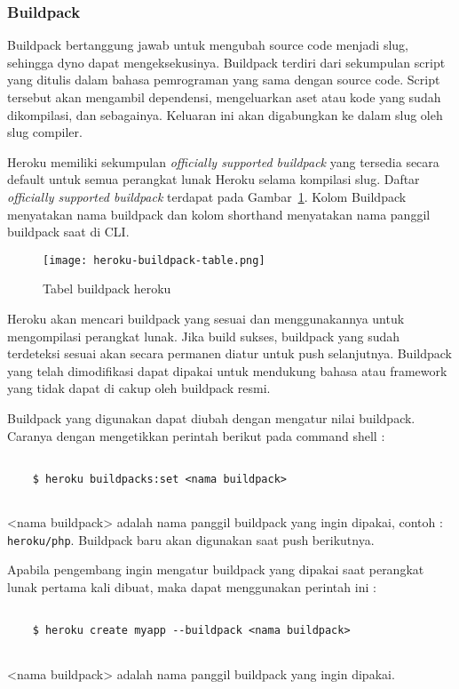 \subsubsection{Buildpack}
Buildpack bertanggung jawab untuk mengubah source code menjadi slug, sehingga dyno dapat mengeksekusinya. Buildpack terdiri dari sekumpulan script yang ditulis dalam bahasa pemrograman yang sama dengan source code. Script tersebut akan mengambil dependensi, mengeluarkan aset atau kode yang sudah dikompilasi, dan sebagainya. Keluaran ini akan digabungkan ke dalam slug oleh slug compiler.

Heroku memiliki sekumpulan \textit{officially supported buildpack} yang tersedia secara default untuk semua perangkat lunak Heroku selama kompilasi slug. Daftar \textit{officially supported buildpack} terdapat pada Gambar~\ref{fig:heroku-buildpack-table}. Kolom Buildpack menyatakan nama buildpack dan kolom shorthand menyatakan nama panggil buildpack saat di CLI.

\begin{figure}[H]
	\centering  
	\texttt{[image: heroku-buildpack-table.png]}  
	\caption[Tabel buildpack heroku]{Tabel buildpack heroku} 
	\label{fig:heroku-buildpack-table} 
\end{figure}

Heroku akan mencari buildpack yang sesuai dan menggunakannya untuk mengompilasi perangkat lunak. Jika build sukses, buildpack yang sudah terdeteksi sesuai akan secara permanen diatur untuk push selanjutnya. Buildpack yang telah dimodifikasi dapat dipakai untuk mendukung bahasa atau framework yang tidak dapat di cakup oleh buildpack resmi.

Buildpack yang digunakan dapat diubah dengan mengatur nilai buildpack. Caranya dengan mengetikkan perintah berikut pada command shell :
\begin{lstlisting}

	$ heroku buildpacks:set <nama buildpack>
	
\end{lstlisting}
<nama buildpack> adalah nama panggil buildpack yang ingin dipakai, contoh : \texttt{heroku/php}. Buildpack baru akan digunakan saat push berikutnya. 

Apabila pengembang ingin mengatur buildpack yang dipakai saat perangkat lunak pertama kali dibuat, maka dapat menggunakan perintah ini :
\begin{lstlisting}

	$ heroku create myapp --buildpack <nama buildpack>
	
\end{lstlisting}
<nama buildpack> adalah nama panggil buildpack yang ingin dipakai.

